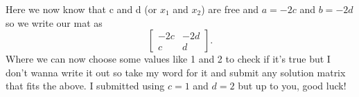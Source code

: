 \documentclass{report}
\begin{document}
Here we now know that c and d (or $ x_1 $ and $ x_2 $) are free and $ a= -2c $ and $ b=-2d $ so we write our mat as
\[
	\begin{bmatrix} -2c & -2d \\ c & d \end{bmatrix} 
.\] 
Where we can now choose some values like 1 and 2 to check if it's true but I don't wanna write it out so take my word for it and submit any solution matrix that fits the above. I submitted using $ c=1 $ and $ d=2 $ but up to you, good luck!
\end{document}
